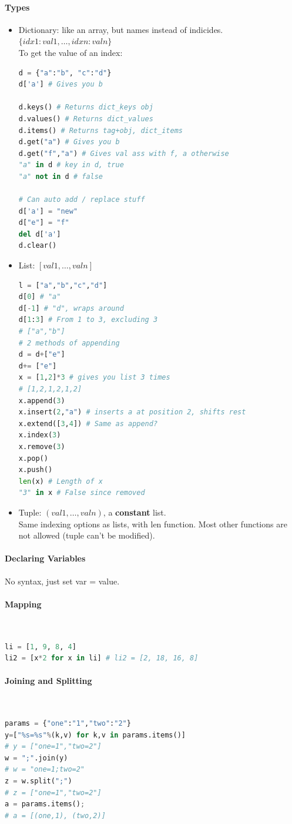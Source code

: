 \documentclass[12 pt]{article}
\begin{document}
\paragraph{Types}
\begin{itemize}
\item Dictionary: like an array, but names instead of indicides. $\{idx1:val1,\ldots,idxn:valn\}$
  \\ To get the value of an index:
\begin{lstlisting}[language=python]
d = {"a":"b", "c":"d"}
d['a'] # Gives you b

d.keys() # Returns dict_keys obj
d.values() # Returns dict_values
d.items() # Returns tag+obj, dict_items
d.get("a") # Gives you b
d.get("f","a") # Gives val ass with f, a otherwise
"a" in d # key in d, true
"a" not in d # false

# Can auto add / replace stuff
d['a'] = "new"
d["e"] = "f"
del d['a']
d.clear()
\end{lstlisting}
\item List: $[val1,\ldots,valn]$
\begin{lstlisting}[language=python]
l = ["a","b","c","d"]
d[0] # "a"
d[-1] # "d", wraps around
d[1:3] # From 1 to 3, excluding 3
# ["a","b"]
# 2 methods of appending
d = d+["e"]
d+= ["e"]
x = [1,2]*3 # gives you list 3 times
# [1,2,1,2,1,2]
x.append(3)
x.insert(2,"a") # inserts a at position 2, shifts rest
x.extend([3,4]) # Same as append?
x.index(3)
x.remove(3)
x.pop()
x.push()
len(x) # Length of x
"3" in x # False since removed
\end{lstlisting}
\item Tuple: $(val1,\ldots,valn)$, a \textbf{constant} list.
  \\ Same indexing options as lists, with len function. Most other functions are not allowed (tuple can't be modified).
\end{itemize}
\paragraph{Declaring Variables} No syntax, just set var = value. 
\paragraph{Mapping}~
\begin{lstlisting}[language=python]
li = [1, 9, 8, 4]
li2 = [x*2 for x in li] # li2 = [2, 18, 16, 8]
\end{lstlisting}
\paragraph{Joining and Splitting}~
\begin{lstlisting}[language=python]
params = {"one":"1","two":"2"}
y=["%s=%s"%(k,v) for k,v in params.items()]
# y = ["one=1","two=2"]
w = ";".join(y)
# w = "one=1;two=2"
z = w.split(";")
# z = ["one=1","two=2"]
a = params.items();
# a = [(one,1), (two,2)]
\end{lstlisting}
\end{document}
